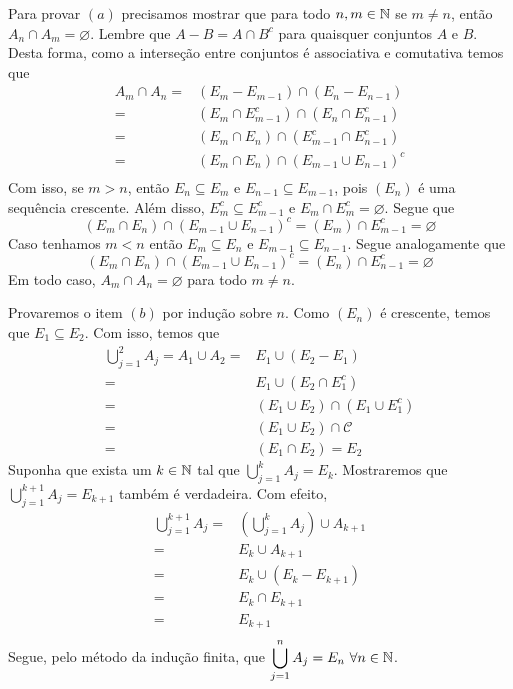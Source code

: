 \begin{prova}
    Para provar $(a)$ precisamos mostrar que para todo $n,m \in \operatorname{\mathbb{N}}$ se $m \neq n$, então $A_n \cap A_m = \varnothing$.
    Lembre que $A - B = A\cap B^c$ para quaisquer conjuntos $A$ e $B$.
    Desta forma, como a interseção entre conjuntos é associativa e comutativa temos que
    \begin{align*}
        A_m\cap A_n =& (E_m - E_{m -1}) \cap (E_n - E_{n -1})\\
        =& (E_m \cap E_{m -1}^c) \cap (E_n \cap E_{n -1}^c)\\
        =& (E_m \cap E_n) \cap ( E_{m -1}^c\cap E_{n -1}^c)\\
        =& (E_m \cap E_n) \cap \left( E_{m -1}\cup E_{n -1}\right)^c\\
    \end{align*}
    Com isso, se $m > n$, então $E_n \subseteq E_m$ e $E_{n-1} \subseteq E_{m-1}$, pois $(E_n)$ é uma sequência crescente.
    Além disso, $E_m^c \subseteq E_{m -1}^c$ e $E_m \cap E_m^c = \varnothing$.
    Segue que
    $$
    (E_m \cap E_n) \cap \left( E_{m -1}\cup E_{n -1}\right)^c =
    (E_m) \cap E_{m -1}^c = 
    \varnothing
    $$
    Caso tenhamos $m < n$ então $E_m \subseteq E_n$ e $E_{m-1} \subseteq E_{n-1}$.
    Segue analogamente que 
    $$
    (E_m \cap E_n) \cap \left( E_{m -1}\cup E_{n -1}\right)^c =
    (E_n) \cap E_{n -1}^c = 
    \varnothing
    $$
    Em todo caso, $A_m \cap A_n = \varnothing$ para todo $m \neq n$.

    Provaremos o item $(b)$ por indução sobre $n$.
    Como $(E_n)$ é crescente, temos que $E_1 \subseteq E_2$.
    Com isso, temos que 
        \begin{align*}
            \bigcup_{j = 1}^2 A_j = A_1 \cup A_2= & E_1 \cup (E_2 - E_1)\\
            = & E_1 \cup (E_2 \cap E_1^c)\\
            = & (E_1 \cup E_2) \cap (E_1 \cup E_1^c)\\
            = & (E_1 \cup E_2) \cap \mathcal{C}\\
            = & (E_1 \cap E_2)
            = E_2  
        \end{align*}
    Suponha que exista um $k \in \operatorname{\mathbb{N}}$ tal que $\displaystyle \bigcup_{j = 1}^k A_j = E_k$.
    Mostraremos que $\displaystyle \bigcup_{j = 1}^{k+1} A_j = E_{k +1}$ também é verdadeira.
    Com efeito, 
    \begin{align*}
        \bigcup_{j = 1}^{k+1} A_j =& \left(\bigcup_{j = 1}^{k} A_j\right) \cup A_{k+1}\\
        =& E_k \cup A_{k +1}\\
        =& E_k \cup (E_k - E_{k+1})\\
        =& E_k \cap E_{k+1}\\
        =& E_{k+1}\\
    \end{align*}
    Segue, pelo método da indução finita, que $\displaystyle \bigcup_{j = 1}^n A_j = E_n\ \forall n \in \operatorname{\mathbb{N}}$.


\end{prova}
